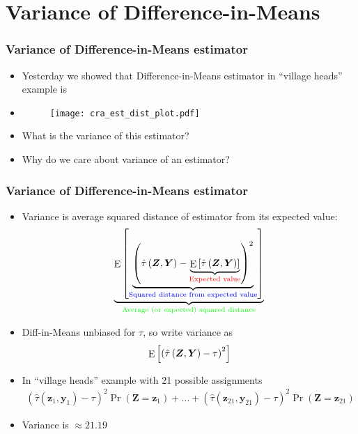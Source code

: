 \documentclass[table, xcolor = {dvipsnames}, 9pt]{beamer}
\theoremstyle{plain}
\DeclareMathOperator{\E}{\rm{E}}
\begin{document}
\section{Variance of Difference-in-Means}
\begin{frame}
\frametitle{Variance of Difference-in-Means estimator}
\begin{itemize}
\item Yesterday we showed that Difference-in-Means estimator in ``village heads'' example is
\item[]
\begin{figure}[H]
\texttt{[image: cra\_est\_dist\_plot.pdf]}
\end{figure}
\item What is the variance of this estimator?
\item Why do we care about variance of an estimator?
\end{itemize}
\end{frame}
\begin{frame}
\frametitle{Variance of Difference-in-Means estimator}
\begin{itemize}
\item Variance is average squared distance of estimator from its expected value:
\begin{equation*}
\underbrace{\E\left[\underbrace{\left(\hat{\tau}\left(\bm{Z}, \bm{Y}\right) - \underbrace{\E\left[\hat{\tau}\left(\bm{Z}, \bm{Y}\right)\right]}_{\color{red}{\text{Expected value}}}\right)^2}_{\color{blue}{\text{Squared distance from expected value}}}\right]}_{\color{green}{\text{Average (or expected) squared distance}}}
\end{equation*} \pause
\item Diff-in-Means unbiased for $\tau$, so write variance as
\begin{equation*}
\E\left[\left(\hat{\tau}\left(\bm{Z}, \bm{Y}\right) - \tau\right)^2\right]
\end{equation*} \pause
\item In ``village heads'' example with 21 possible assignments
\begin{align*}
\left(\hat{\tau}\left(\bm{z}_1, \bm{y}_1\right) - \tau\right)^2 \Pr\left(\bm{Z} = \bm{z}_1\right) + \ldots + \left(\hat{\tau}\left(\bm{z}_{21}, \bm{y}_{21}\right) - \tau\right)^2 \Pr\left(\bm{Z} = \bm{z}_{21}\right)
\end{align*}
\item[] Variance is $\approx 21.19$
\end{itemize}
\end{frame}
\end{document}
